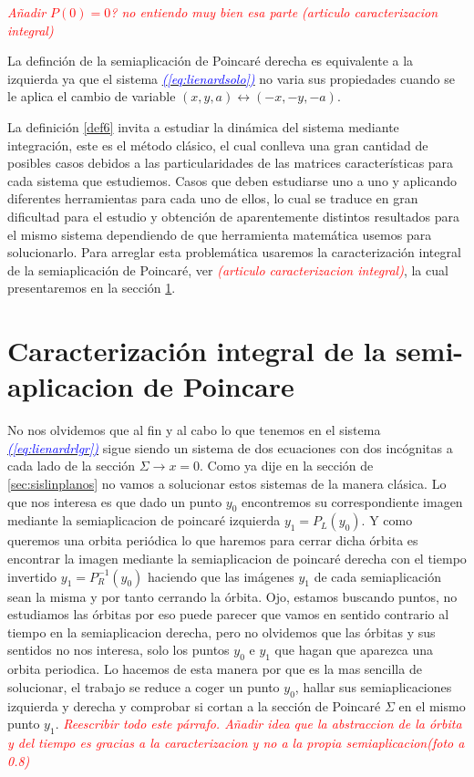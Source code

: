 \documentclass[12pt,a4paper]{report} %
\newcommand{\eref}[1]{\hyperref[#1]{\textcolor{blue}{\textit{(\ref*{#1})}}}}
\begin{document}
	\textit{\textcolor{red}{Añadir $P(0)=0$? no entiendo muy bien esa parte (articulo caracterizacion integral)}}
	
	
	La definción de la semiaplicación de Poincaré derecha es equivalente a la izquierda ya que el sistema \eref{eq:lienardsolo} no varia sus propiedades cuando se le aplica el cambio de variable $(x,y,a)\longleftrightarrow(-x,-y,-a)$.
	
	
	\vspace{0.5cm} La definición \ref{def6} invita a estudiar la dinámica del sistema mediante integración, este es el método clásico, el cual conlleva una gran cantidad de posibles casos debidos a las particularidades de las matrices características para cada sistema que estudiemos. Casos que deben estudiarse uno a uno y aplicando diferentes herramientas para cada uno de ellos, lo cual se traduce en gran dificultad para el estudio y obtención de aparentemente distintos resultados para el mismo sistema dependiendo de que herramienta matemática usemos para solucionarlo. Para arreglar esta problemática usaremos la caracterización integral de la semiaplicación de Poincaré, ver \textit{\textcolor{red}{(articulo caracterizacion integral)}}, la cual presentaremos en la sección \ref{sec41}.
	\newpage
	
	
	
	\section{Caracterización integral de la semi-aplicacion de Poincare}
	\label{sec41}
	
	No nos olvidemos que al fin y al cabo lo que tenemos en el sistema \eref{eq:lienardrlgr} sigue siendo un sistema de dos ecuaciones con dos incógnitas a cada lado de la sección $\varSigma \rightarrow x=0$. Como ya dije en la sección de \ref{sec:sislinplanos} no vamos a solucionar estos sistemas de la manera clásica. Lo que nos interesa es que dado un punto $y_0$ encontremos su correspondiente imagen mediante la semiaplicacion de poincaré izquierda $y_1=P_L(y_0)$. Y como queremos una orbita periódica lo que haremos para cerrar dicha órbita es encontrar la imagen mediante la semiaplicacion de poincaré derecha con el tiempo invertido $y_1=P_R^{-1}(y_0)$ haciendo que las imágenes $y_1$ de cada semiaplicación sean la misma y por tanto cerrando la órbita. Ojo, estamos buscando puntos, no estudiamos las órbitas por eso puede parecer que vamos en sentido contrario al tiempo en la semiaplicacion derecha, pero no olvidemos que las órbitas y sus sentidos no nos interesa, solo los puntos $y_0$ e $y_1$ que hagan que aparezca una orbita periodica. Lo hacemos de esta manera por que es la mas sencilla de solucionar, el trabajo se reduce a coger un punto $y_0$, hallar sus semiaplicaciones izquierda y derecha y comprobar si cortan a la sección de Poincaré $\varSigma$ en el mismo punto $y_1$. 
	\textit{\textcolor{red}{Reescribir todo este párrafo. Añadir idea que la abstraccion de la órbita y del tiempo es gracias a la caracterizacion y no a la propia semiaplicacion(foto a 0.8)}}
	
\end{document}
